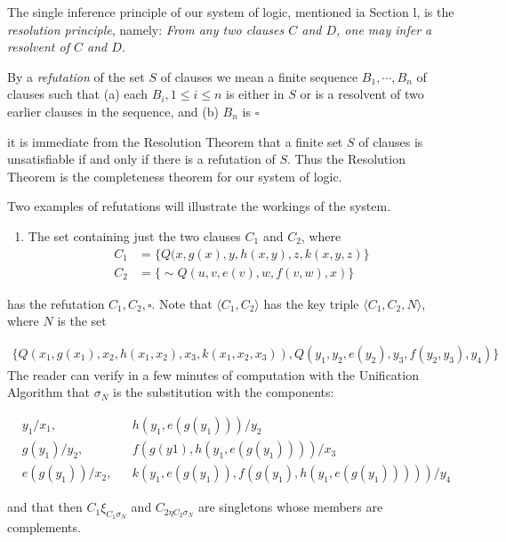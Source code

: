 \documentclass[8pt]{extarticle}
\begin{document}
The single inference principle of our system of logic, mentioned ia Section l,
is the \emph{resolution principle}, namely: \emph{From any two clauses $C$ and $D$, one may infer a resolvent of $C$ and $D$.}

By a \emph{refutation} of the set $S$ of clauses we mean a finite sequence $B_1,\dotsm,B_n$ of clauses such that (a) each $B_i, 1 \leq i \leq n$ is either in $S$ or is a resolvent of two earlier clauses in the sequence, and (b) $B_n$ is $\square$

it is immediate from the Resolution Theorem that a finite set $S$ of clauses is
unsatisfiable if and only if there is a refutation of $S$. Thus the Resolution Theorem is the completeness theorem for our system of logic. 

Two examples of refutations will illustrate the workings of the system. 

\begin{enumerate}[label=Example \arabic*.]
    \item The set containing just the two clauses $C_1$ and $C_2$, where
        \begin{align*}
            C_1 &= \{Q(x,g(x),y,h(x,y),z,k(x,y,z)\}\\
            C_2 &= \{\sim Q(u,v,e(v),w,f(v,w),x)\}
        \end{align*}
\end{enumerate}
\noindent
has the refutation $C_1, C_2, \square$. Note that $\langle C_1, C_2\rangle$ has the key triple $\langle C_1, C_2, N\rangle$, where $N$ is the set

\begin{align*}
    \{Q(x_1,g(x_1),x_2,h(x_1,x_2),x_3,k(x_1,x_2,x_3)),
    Q(y_1,y_2,e(y_2),y_3,f(y_2,y_3),y_4)\}
\end{align*}
\noindent
The reader can verify in a few minutes of computation with the Unification
Algorithm that $\sigma_N$ is the substitution with the components: 

\begin{align*}
    & y_1/x_1,       &&  h(y_1,e(g(y_1)))/y_2\\
    & g(y_1)/y_2,    &&  f(g(y1), h(y_1, e(g(y_1))))/x_3\\
    & e(g(y_1))/x_2, &&  k(y_1, e(g(y_1)), f(g(y_1), h(y_1, e(g(y_1)))))/y_4
\end{align*}

\noindent
and that then $C_1\xi_{C_1\sigma_N}$ and $C_{2\eta C_2\sigma_N}$ are singletons whose members are complements.
\end{document}
